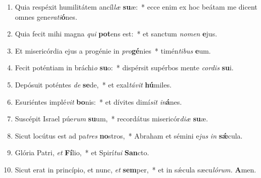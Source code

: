 \documentclass[12pt]{book}
\begin{document}
\begin{enumerate}[label=\arabic*.,%
			leftmargin=0pt, %
			itemindent=0mm, %
			labelsep=3pt, %
			labelwidth=0pt, %
			rightmargin=0pt, %
			parsep=0pt, %
			topsep=0pt, %
			itemsep=0pt,%
			start=3]
\item  Quia respéxit humilitátem ancíl\tinyhspace\textit{læ} \textbf{su}æ:~* ecce enim ex hoc beátam me dicent omnes gene\textit{rati}\textbf{ó}nes.
\item  Quia fecit mihi magna \textit{qui} \textbf{pot}ens est:~* et san\-ctum \textit{nomen} \textbf{e}jus.
\item  Et misericórdia ejus a progénie in \textit{pro}\hspace*{0.03em}\textbf{gé}nies~* timén\textit{tibus} \textbf{e}um.
\item  Fecit poténtiam in bráchi\textit{o} \textbf{su}o:~* dispérsit supérbos mente \textit{cordis} \textbf{su}i.
\item  Depósuit poténtes \textit{de} \textbf{se}de,~* et exal\textit{távit} \textbf{hú}miles.
\item  Esuriéntes implé\textit{vit} \textbf{bo}nis:~* et dívites dimí\textit{sit} \textit{in}\textbf{á}nes.
\item  Suscépit Israel púe\textit{rum} \textbf{su}um,~* recordátus misericór\textit{diæ} \textbf{su}æ.
\item Sicut locútus est ad pa\hspace*{0.03em}\textit{tres} \textbf{no}stros,~* Abraham et sémini e\textit{jus} \textit{in} \textbf{sǽ}cula.
\item Glória Patri, \textit{et} \textbf{Fí}lio,~* et Spirí\hspace*{0.03em}\textit{tui} \textbf{San}cto.
\item Sicut erat in princípio, et nunc, \textit{et} \textbf{sem}per,~* et in sǽcula sæcu\hspace*{0.03em}\textit{lórum.} \textbf{A}men.
\end{enumerate}

\myrule

\end{document}
